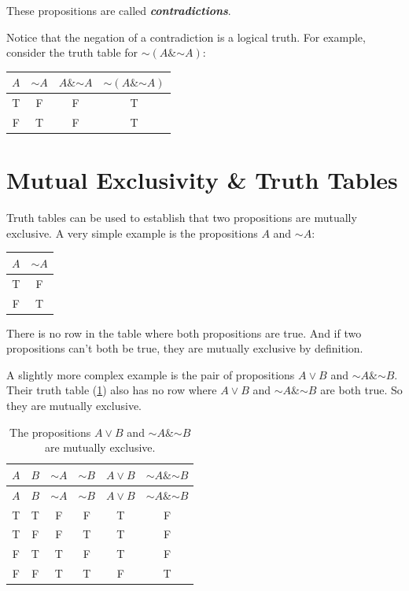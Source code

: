 \documentclass[justified]{tufte-book}
\renewcommand{\neg}{\mathbin{\sim}}
\renewcommand{\wedge}{\mathbin{\&}}
\theoremstyle{definition}
\theoremstyle{definition}
\theoremstyle{definition}
\theoremstyle{definition}
\theoremstyle{remark}
\begin{document}
These propositions are called \textbf{\emph{contradictions}}.

Notice that the negation of a contradiction is a logical truth. For example, consider the truth table for \(\neg (A \wedge \neg A)\):

\begin{longtable}[]{@{}cccc@{}}
\toprule
\(A\) & \(\neg A\) & \(A \wedge \neg A\) & \(\neg (A \wedge \neg A)\) \\
\midrule
\endhead
T & F & F & T \\
F & T & F & T \\
\bottomrule
\end{longtable}

\hypertarget{mutual-exclusivity-truth-tables}{%
\section{Mutual Exclusivity \& Truth Tables}\label{mutual-exclusivity-truth-tables}}

Truth tables can be used to establish that two propositions are mutually exclusive. A very simple example is the propositions \(A\) and \(\neg A\):

\begin{longtable}[]{@{}cc@{}}
\toprule
\(A\) & \(\neg A\) \\
\midrule
\endhead
T & F \\
F & T \\
\bottomrule
\end{longtable}

There is no row in the table where both propositions are true. And if two propositions can't both be true, they are mutually exclusive by definition.

A slightly more complex example is the pair of propositions \(A \vee B\) and \(\neg A \wedge \neg B\). Their truth table (\ref{tab:avbnaanb}) also has no row where \(A \vee B\) and \(\neg A \wedge \neg B\) are both true. So they are mutually exclusive.

\begin{longtable}[]{@{}cccccc@{}}
\caption{\label{tab:avbnaanb}The propositions \(A \vee B\) and \(\neg A \wedge \neg B\) are mutually exclusive.}\tabularnewline
\toprule
\(A\) & \(B\) & \(\neg A\) & \(\neg B\) & \(A \vee B\) & \(\neg A \wedge \neg B\) \\
\midrule
\endfirsthead
\toprule
\(A\) & \(B\) & \(\neg A\) & \(\neg B\) & \(A \vee B\) & \(\neg A \wedge \neg B\) \\
\midrule
\endhead
T & T & F & F & T & F \\
T & F & F & T & T & F \\
F & T & T & F & T & F \\
F & F & T & T & F & T \\
\bottomrule
\end{longtable}
\end{document}
